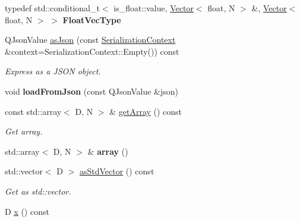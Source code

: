 \begin{DoxyCompactItemize}
typedef std\+::conditional\+\_\+t$<$ is\+\_\+float\+::value, \mbox{\hyperlink{classrev_1_1_vector}{Vector}}$<$ float, N $>$ \&, \mbox{\hyperlink{classrev_1_1_vector}{Vector}}$<$ float, N $>$ $>$ {\bfseries Float\+Vec\+Type}
\item 
\mbox{\label{classrev_1_1_vector_ace9affb37e8be9ac29809ee80a3e76bf}} 
Q\+Json\+Value \mbox{\hyperlink{classrev_1_1_vector_ace9affb37e8be9ac29809ee80a3e76bf}{as\+Json}} (const \mbox{\hyperlink{structrev_1_1_serialization_context}{Serialization\+Context}} \&context=Serialization\+Context\+::\+Empty()) const
\begin{DoxyCompactList}\small\item\em Express as a J\+S\+ON object. \end{DoxyCompactList}\item 
\mbox{\label{classrev_1_1_vector_a6f4148f2ce2d40ba9897c54011e2126e}} 
void {\bfseries load\+From\+Json} (const Q\+Json\+Value \&json)
\item 
\mbox{\label{classrev_1_1_vector_af15afd92e8cbbea7e9e4191c20ac37d7}} 
const std\+::array$<$ D, N $>$ \& \mbox{\hyperlink{classrev_1_1_vector_af15afd92e8cbbea7e9e4191c20ac37d7}{get\+Array}} () const
\begin{DoxyCompactList}\small\item\em Get array. \end{DoxyCompactList}\item 
\mbox{\label{classrev_1_1_vector_ade172eaa5295102ee5109bc54690d8af}} 
std\+::array$<$ D, N $>$ \& {\bfseries array} ()
\item 
\mbox{\label{classrev_1_1_vector_a7aded379c50c5a7a865f7e74551f628b}} 
std\+::vector$<$ D $>$ \mbox{\hyperlink{classrev_1_1_vector_a7aded379c50c5a7a865f7e74551f628b}{as\+Std\+Vector}} () const
\begin{DoxyCompactList}\small\item\em Get as std\+::vector. \end{DoxyCompactList}\item 
\mbox{\label{classrev_1_1_vector_a0515a05b6d5a48f4357a515ede57513d}} 
D \mbox{\hyperlink{classrev_1_1_vector_a0515a05b6d5a48f4357a515ede57513d}{x}} () const

\end{DoxyCompactItemize}
